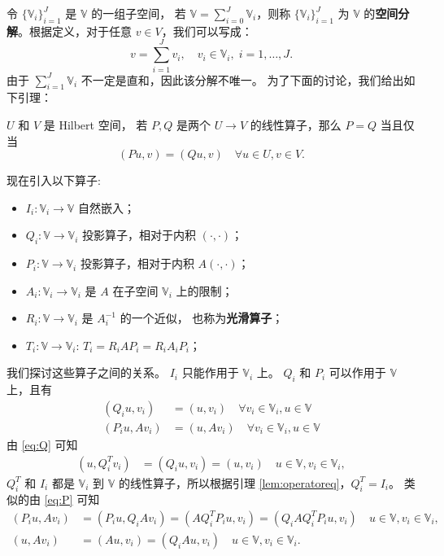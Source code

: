 \documentclass[letterpaper,12pt]{article}
\begin{document}
令 $\{\mathbb{V}_i\}_{i=1}^J$ 是 $\mathbb{V}$ 的一组子空间，
若 $\mathbb{V} = \sum_{i=0}^{J} \mathbb{V}_i$，则称 $\{\mathbb{V}_i\}_{i=1}^J$
为 $\mathbb{V}$ 的\textbf{空间分解}。根据定义，对于任意 $v \in V$，我们可以写成：
$$
v = \sum_{i=1}^J v_i, \quad v_i \in \mathbb{V}_i, \; i = 1, \dots, J.
$$
由于 $\sum_{i=1}^J \mathbb{V}_i$ 不一定是直和，因此该分解不唯一。
为了下面的讨论，我们给出如下引理：
\begin{lemma}
    \label{lem:operatoreq}
    $U$ 和 $V$ 是 Hilbert 空间，
    若 $P, Q$ 是两个 $U \to V$ 的线性算子，那么 $P = Q$ 当且仅当
    \begin{equation}
        (P u, v) = (Q u, v) \quad \forall u \in U, v \in V.
    \end{equation}
\end{lemma}
现在引入以下算子:
\begin{itemize}
    \item $I_i: \mathbb{V}_i \to \mathbb{V}$ 自然嵌入；
    \item $Q_i: \mathbb{V} \to \mathbb{V}_i$ 投影算子，相对于内积 $(\cdot, \cdot)$；
    \item $P_i: \mathbb{V} \to \mathbb{V}_i$ 投影算子，相对于内积 $A(\cdot, \cdot)$；
    \item $A_i: \mathbb{V}_i \to \mathbb{V}_i$ 是 $A$ 在子空间 $\mathbb{V}_i$
        上的限制；
    \item $R_i: \mathbb{V} \to \mathbb{V}_i$ 是 $A^{-1}_i$ 的一个近似，
        也称为\textbf{光滑算子}； 
    \item $T_i: \mathbb{V} \to \mathbb{V}_i$: 
        $T_i = R_i A P_i = R_i A_i P_i$；
\end{itemize}
我们探讨这些算子之间的关系。
$I_i$ 只能作用于 $\mathbb{\mathbb{V}}_i$ 上。
$Q_i$ 和 $P_i$ 可以作用于 $\mathbb{V}$ 上，且有 
\begin{align}
(Q_i u, v_i) & = (u, v_i) \quad
\forall v_i \in \mathbb{V}_i, u \in \mathbb{V} 
\label{eq:Q}\\
(P_i u, A v_i) & = (u, A v_i) \quad
\forall v_i \in \mathbb{V}_i, u \in \mathbb{V} \label{eq:P}
\end{align}
由 \eqref{eq:Q} 可知 
$$
\begin{aligned}
(u, Q_i^T v_i) & = (Q_i u, v_i) = (u, v_i) \quad u \in \mathbb{V}, v_i \in
\mathbb{V}_i,
\end{aligned}
$$
$Q_i^T$ 和 $I_i$ 都是 $\mathbb{V}_i$ 到 $\mathbb{V}$ 的线性算子，所以根据引理
\ref{lem:operatoreq}，$Q_i^T = I_i$。
类似的由 \eqref{eq:P} 可知
$$
\begin{aligned}
    (P_i u, A v_i) & = (P_i u, Q_i A v_i) =
    (A Q_i^TP_i u, v_i) = (Q_i A Q_i^T P_i u, v_i) \quad u \in
    \mathbb{V}, v_i \in \mathbb{V}_i, \\
    (u, A v_i) & = (A u, v_i) = (Q_i A u, v_i) \quad u \in \mathbb{V}, v_i \in
    \mathbb{V}_i.
\end{aligned}
$$
\end{document}
